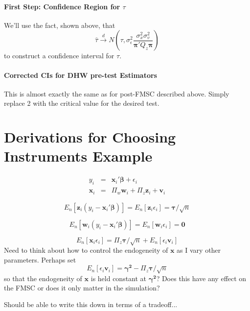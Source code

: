 \documentclass[12pt]{article}
\theoremstyle{definition}
\begin{document}
\paragraph{First Step: Confidence Region for $\tau$}
We'll use the fact, shown above, that
    $$\widehat{\tau} \overset{d}{\rightarrow} N\left(\tau,\sigma_\epsilon^2 \frac{\sigma_x^2\sigma_v^2}{\boldsymbol{\pi}'Q_z \boldsymbol{\pi}}\right)$$
to construct a confidence interval for $\tau$.

\paragraph{Corrected CIs for DHW pre-test Estimators}
This is almost exactly the same as for post-FMSC described above. Simply replace 2 with the critical value for the desired test.






\section{Derivations for Choosing Instruments Example}

\begin{eqnarray}
    y_i &=& \mathbf{x}_i' \boldsymbol{\beta} +  \epsilon_i\\
    \mathbf{x}_i &=& \Pi_w \mathbf{w}_i + \Pi_z \mathbf{z}_i + \mathbf{v}_i
\end{eqnarray}

$$E_n[\mathbf{z}_i(y_i - \mathbf{x}_i' \boldsymbol{\beta})] = E_n[\mathbf{z}_i\epsilon_i] = \boldsymbol{\tau}/\sqrt{n}$$

$$E_n[\mathbf{w}_i (y_i - \mathbf{x}_i' \boldsymbol{\beta})]= E_n[\mathbf{w}_i\epsilon_i] = \mathbf{0}$$

$$E_n[\mathbf{x}_i \epsilon_i] = \Pi_z \boldsymbol{\tau}/\sqrt{n} + E_n[\epsilon_i \mathbf{v}_i]$$
Need to think about how to control the endogeneity of $\mathbf{x}$ as I vary other parameters. Perhaps set
  $$E_n[\epsilon_i \mathbf{v}_i] = \boldsymbol{\gamma^2} - \Pi_z \boldsymbol{\tau}/\sqrt{n}$$ so that the endogeneity of $\mathbf{x}$ is held constant at $\boldsymbol{\gamma^2}$? Does this have any effect on the FMSC or does it only matter in the simulation?
  
  Should be able to write this down in terms of a tradeoff...
\end{document}
